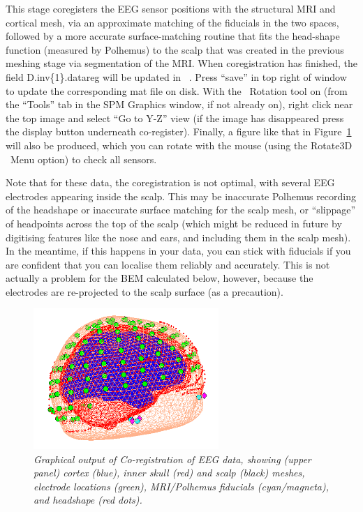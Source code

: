 This stage coregisters the EEG sensor positions with the structural MRI and cortical mesh, via an approximate matching of the fiducials in the two spaces, followed by a more accurate surface-matching routine that fits the head-shape function (measured by Polhemus) to the scalp that was created in the previous meshing stage via segmentation of the MRI. When coregistration has finished, the field D.inv\{1\}.datareg will be updated in \matlab\ . Press ``save'' in top right of window to update the corresponding mat file on disk. With the \matlab\ Rotation tool on (from the ``Tools'' tab in the SPM Graphics window, if not already on), right click near the top image and select ``Go to Y-Z'' view (if the image has disappeared press the display button underneath co-register). Finally, a figure like that in Figure~\ref{multimodal:fig:8} will also be produced, which you can rotate with the mouse (using the Rotate3D \matlab\ Menu option) to check all sensors.

Note that for these data, the coregistration is not optimal, with several EEG electrodes appearing inside the scalp.  This may be inaccurate Polhemus recording of the headshape or inaccurate surface matching for the scalp mesh, or ``slippage'' of headpoints across the top of the scalp (which might be reduced in future by digitising features like the nose and ears, and including them in the scalp mesh). In the meantime, if this happens in your data, you can stick with fiducials if you are confident that you can localise them reliably and accurately. This is not actually a problem for the BEM calculated below, however, because the electrodes are re-projected to the scalp surface (as a precaution).

\begin{figure}
\begin{center}
\includegraphics[width=70mm]{multimodal/figures/eeg_coreg.png}
\caption{\em  Graphical output of Co-registration of EEG data, showing (upper panel) cortex (blue), inner skull (red) and scalp (black) meshes, electrode locations (green), MRI/Polhemus fiducials (cyan/magneta), and headshape (red dots).\label{multimodal:fig:8}}
\end{center}
\end{figure}

